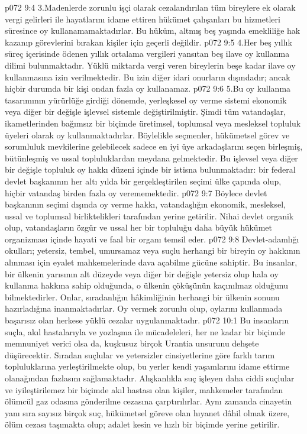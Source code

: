 \vs p072 9:4 3.\bibnobreakspace Madenlerde zorunlu işçi olarak cezalandırılan tüm bireylere ek olarak vergi gelirleri ile hayatlarını idame ettiren hükümet çalışanları bu hizmetleri süresince oy kullanamamaktadırlar. Bu hüküm, altmış beş yaşında emekliliğe hak kazanıp görevlerini bırakan kişiler için geçerli değildir.
\vs p072 9:5 4.\bibnobreakspace Her beş yıllık süreç içerisinde ödenen yıllık ortalama vergileri yansıtan beş ilave oy kullanma dilimi bulunmaktadır. Yüklü miktarda vergi veren bireylerin beşe kadar ilave oy kullanmasına izin verilmektedir. Bu izin diğer idari onurların dışındadır; ancak hiçbir durumda bir kişi ondan fazla oy kullanamaz.
\vs p072 9:6 5.\bibnobreakspace Bu oy kullanma tasarımının yürürlüğe girdiği dönemde, yerleşkesel oy verme sistemi ekonomik veya diğer bir değişle işlevsel sistemle değiştirilmiştir. Şimdi tüm vatandaşlar, ikametlerinden bağımsız bir biçimde üretimsel, toplumsal veya mesleksel topluluk üyeleri olarak oy kullanmaktadırlar. Böylelikle seçmenler, hükümetsel görev ve sorumluluk mevkilerine gelebilecek sadece en iyi üye arkadaşlarını seçen birleşmiş, bütünleşmiş ve ussal topluluklardan meydana gelmektedir. Bu işlevsel veya diğer bir değişle topluluk oy hakkı düzeni içinde bir istisna bulunmaktadır: bir federal devlet başkanının her altı yılda bir gerçekleştirilen seçimi ülke çapında olup, hiçbir vatandaş birden fazla oy verememektedir.
\vs p072 9:7 Böylece devlet başkanının seçimi dışında oy verme hakkı, vatandaşlığın ekonomik, mesleksel, ussal ve toplumsal birliktelikleri tarafından yerine getirilir. Nihai devlet organik olup, vatandaşların özgür ve ussal her bir topluluğu daha büyük hükümet organizması içinde hayati ve faal bir organı temsil eder.
\vs p072 9:8 Devlet\hyp{}adamlığı okulları; yetersiz, tembel, umursamaz veya suçlu herhangi bir bireyin oy hakkının alınması için eyalet mahkemelerinde dava açabilme gücüne sahiptir. Bu insanlar, bir ülkenin yarısının alt düzeyde veya diğer bir değişle yetersiz olup hala oy kullanma hakkına sahip olduğunda, o ülkenin çöküşünün kaçınılmaz olduğunu bilmektedirler. Onlar, sıradanlığın hâkimliğinin herhangi bir ülkenin sonunu hazırladığına inanmaktadırlar. Oy vermek zorunlu olup, oylarını kullanmada başarısız olan herkese yüklü cezalar uygulanmaktadır.
\vs p072 10:1 Bu insanların suçla, akıl hastalarıyla ve yozlaşma ile mücadeleleri, her ne kadar bir biçimde memnuniyet verici olsa da, kuşkusuz birçok Urantia unsurunu dehşete düşürecektir. Sıradan suçlular ve yetersizler cinsiyetlerine göre farklı tarım topluluklarına yerleştirilmekte olup, bu yerler kendi yaşamlarını idame ettirme olanağından fazlasını sağlamaktadır. Alışkanlıkla suç işleyen daha ciddi suçlular ve iyileştirilemez bir biçimde akıl hastası olan kişiler, mahkemeler tarafından ölümcül gaz odasına gönderilme cezasına çarptırılırlar. Aynı zamanda cinayetin yanı sıra sayısız birçok suç, hükümetsel göreve olan hıyanet dâhil olmak üzere, ölüm cezası taşımakta olup; adalet kesin ve hızlı bir biçimde yerine getirilir.
